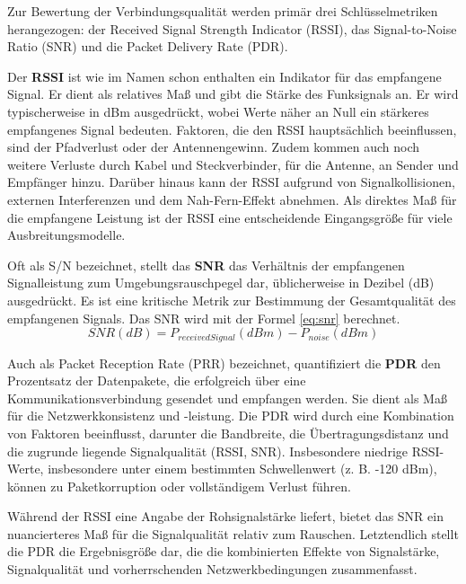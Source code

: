 Zur Bewertung der Verbindungsqualität werden primär drei Schlüsselmetriken herangezogen: der Received Signal Strength Indicator (RSSI), das Signal-to-Noise Ratio (SNR) und die Packet Delivery Rate (PDR).

Der \textbf{RSSI} ist wie im Namen schon enthalten ein Indikator für das empfangene Signal. Er dient als relatives Maß und gibt die Stärke des Funksignals an. Er wird typischerweise in dBm ausgedrückt, wobei Werte näher an Null ein stärkeres empfangenes Signal bedeuten. Faktoren, die den RSSI hauptsächlich beeinflussen, sind der Pfadverlust oder der Antennengewinn. Zudem kommen auch noch weitere Verluste durch Kabel und Steckverbinder, für die Antenne, an Sender und Empfänger hinzu. Darüber hinaus kann der RSSI aufgrund von Signalkollisionen, externen Interferenzen und dem Nah-Fern-Effekt abnehmen. Als direktes Maß für die empfangene Leistung ist der RSSI eine entscheidende Eingangsgröße für viele Ausbreitungsmodelle. 

Oft als S/N bezeichnet, stellt das \textbf{SNR} das Verhältnis der empfangenen Signalleistung zum Umgebungsrauschpegel dar, üblicherweise in Dezibel (dB) ausgedrückt. Es ist eine kritische Metrik zur Bestimmung der Gesamtqualität des empfangenen Signals. \autocite{SignaltoNoiseRatioSNR2020} Das SNR wird mit der Formel \ref{eq:snr} berechnet.
\begin{equation}
\label{eq:snr}
SNR (dB) = P_{receivedSignal} (dBm) - P_{noise} (dBm)
\end{equation}


Auch als Packet Reception Rate (PRR) bezeichnet, quantifiziert die \textbf{PDR} den Prozentsatz der Datenpakete, die erfolgreich über eine Kommunikationsverbindung gesendet und empfangen werden. Sie dient als Maß für die Netzwerkkonsistenz und -leistung. Die PDR wird durch eine Kombination von Faktoren beeinflusst, darunter die Bandbreite, die Übertragungsdistanz und die zugrunde liegende Signalqualität (RSSI, SNR). Insbesondere niedrige RSSI-Werte, insbesondere unter einem bestimmten Schwellenwert (z. B. -120 dBm), können zu Paketkorruption oder vollständigem Verlust führen.

Während der RSSI eine Angabe der Rohsignalstärke liefert, bietet das SNR ein nuancierteres Maß für die Signalqualität relativ zum Rauschen. Letztendlich stellt die PDR die Ergebnisgröße dar, die die kombinierten Effekte von Signalstärke, Signalqualität und vorherrschenden Netzwerkbedingungen zusammenfasst. \autocite{RSSISNR}